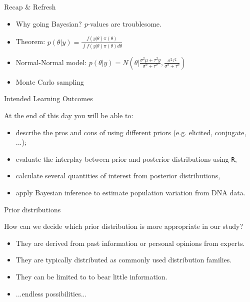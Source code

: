 
\begin{frame}{Recap \& Refresh}

        \begin{itemize}
		\item Why going Bayesian? \textit{p}-values are troublesome.
		\item Theorem: $p({\theta}|{y}) = \frac{f({y}|{\theta})\pi({\theta})}{\int f({y}|{\theta}) \pi({\theta})  d{\theta}}$
		\item Normal-Normal model: $p(\theta|y) = N(\theta|\frac{\sigma^2\mu+\tau^2y}{\sigma^2+\tau^2},\frac{\sigma^2\tau^2}{\sigma^2 + \tau^2})$
        	\item Monte Carlo sampling        
        \end{itemize}

\end{frame}

\begin{frame}{Intended Learning Outcomes}

        At the end of this day you will be able to:
        \begin{itemize}
                \item describe the pros and cons of using different priors (e.g. elicited,
                conjugate, ...);
                \item evaluate the interplay between prior and posterior distributions using \texttt{R},
                \item calculate several quantities of interest from posterior distributions,
                \item apply Bayesian inference to estimate population variation from DNA data.
        \end{itemize}

\end{frame}

\begin{frame}{Prior distributions}

	How can we decide which prior distribution is more appropriate in our study?
	\begin{itemize}
		\item They are derived from past information or personal opinions from experts.
		\item They are typically distributed as commonly used distribution families.
		\item They can be limited to to bear little information.
		\item ...endless possibilities...
	\end{itemize}

\end{frame}


